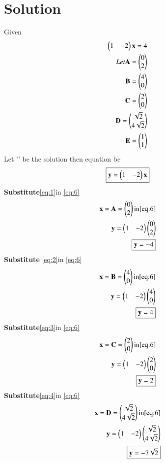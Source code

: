 \documentclass[journal,12pt,twocolumn]{IEEEtran}
\begin{document}
\section{Solution}
Given 
\begin{align}
\begin{pmatrix}1&-2\end{pmatrix}\mathbf{x}=4\\
Let 
\mathbf{A}=\begin{pmatrix}0\\2\end{pmatrix}\label{eq:1} \\
\mathbf{B}=\begin{pmatrix}4\\0\end{pmatrix}\label{eq:2} \\
\mathbf{C}=\begin{pmatrix}2\\0\end{pmatrix} \label{eq:3}\\
\mathbf{D}=\begin{pmatrix}\sqrt{2}\\4\sqrt{2}\end{pmatrix}\label{eq:4} \\
\mathbf{E}=\begin{pmatrix}1\\1\end{pmatrix}\label{eq:5}
\end{align}
Let '' be the solution then equation be 
\begin{equation} \label{eq:6}
\boxed{\mathbf{y}=\begin{pmatrix}1&-2\end{pmatrix}\mathbf{x}}
\end{equation}
\textbf{Substitute}\eqref{eq:1}in \eqref{eq:6}
\begin{align}
 \mathbf{x}=\mathbf{A}=\begin{pmatrix}0\\2\end{pmatrix}\text{in} \eqref{eq:6}\\
          \mathbf{y}=\begin{pmatrix}1&-2\end{pmatrix}\begin{pmatrix}0\\2\end{pmatrix}\\
          \boxed{\mathbf{y}=-4}
\end{align}
\textbf{Substitute }\eqref{eq:2}in \eqref{eq:6}
\begin{align}
\mathbf{x}=\mathbf{B}=\begin{pmatrix}4\\0\end{pmatrix}\text{in} \eqref{eq:6}\\
          \mathbf{y}=\begin{pmatrix}1&-2\end{pmatrix}\begin{pmatrix}4\\0\end{pmatrix}\\
          \boxed{\mathbf{y}=4}
\end{align}
\textbf{Substitute}\eqref{eq:3}in \eqref{eq:6}
\begin{align}
 \mathbf{x}=\mathbf{C}=\begin{pmatrix}2\\0\end{pmatrix}\text{in} \eqref{eq:6}\\
          \mathbf{y}=\begin{pmatrix}1&-2\end{pmatrix}\begin{pmatrix}2\\0\end{pmatrix}\\
          \boxed{\mathbf{y}=2}   
\end{align}
\textbf{Substitute}\eqref{eq:4}in \eqref{eq:6}
\begin{align}
\mathbf{x}=\mathbf{D}=\begin{pmatrix}\sqrt{2}\\4\sqrt{2}\end{pmatrix}\text{in} \eqref{eq:6}\\
          \mathbf{y}=\begin{pmatrix}1&-2\end{pmatrix}\begin{pmatrix}\sqrt{2}\\4\sqrt{2}\end{pmatrix}\\
          \boxed{\mathbf{y}=-7\sqrt{2}}    
\end{align}
\end{document}
